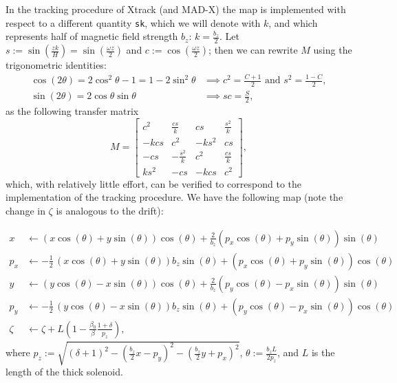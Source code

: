 In the tracking procedure of Xtrack (and MAD-X) the map is implemented with respect to a different quantity \verb|sk|, which we will denote with $k$, and which represents half of magnetic field strength $b_z$: $k = \frac{b_z}{2}$.
Let $s := \sin(\frac{z k}{H}) = \sin(\frac{\omega z}{2})$ and $c := \cos(\frac{\omega z}{2})$; then we can rewrite $M$ using the trigonometric identities:
\begin{align*}
  \cos(2 \theta) = 2 \cos^2\theta - 1 = 1 - 2 \sin^2\theta &\implies c^2 = \frac{C + 1}{2} \text{ and } s^2 = \frac{1 - C}{2}, \\
  \sin(2 \theta) = 2 \cos\theta \sin\theta &\implies sc = \frac{S}{2},
\end{align*}
as the following transfer matrix
\[
  M = \begin{bmatrix}
    c^2 & \frac{cs}{k} & cs & \frac{s^2}{k} \\
    -kcs & c^2 & -ks^2 & cs \\
    -cs & -\frac{s^2}{k} & c^2 & \frac{cs}{k} \\
    ks^2 & -cs & -kcs & c^2
  \end{bmatrix},
\]
which, with relatively little effort, can be verified to correspond to the implementation of the tracking procedure.
We have the following map (note the change in $\zeta$ is analogous to the drift):

\begin{align*}
  x &\leftarrow {\left(x \cos\left(\theta\right) + y \sin\left(\theta\right)\right)} \cos\left(\theta\right) + \frac{2}{b_{z}} {\left(p_{x} \cos\left(\theta\right) + p_{y} \sin\left(\theta\right)\right)} \sin\left(\theta\right) \\
  p_x &\leftarrow -\frac{1}{2} \, {\left(x \cos\left(\theta\right) + y \sin\left(\theta\right)\right)} b_{z} \sin\left(\theta\right) + {\left(p_{x} \cos\left(\theta\right) + p_{y} \sin\left(\theta\right)\right)} \cos\left(\theta\right) \\
  y &\leftarrow {\left(y \cos\left(\theta\right) - x \sin\left(\theta\right)\right)} \cos\left(\theta\right) + \frac{2}{b_{z}} {\left(p_{y} \cos\left(\theta\right) - p_{x} \sin\left(\theta\right)\right)} \sin\left(\theta\right) \\
  p_y &\leftarrow -\frac{1}{2} \, {\left(y \cos\left(\theta\right) - x \sin\left(\theta\right)\right)} b_{z} \sin\left(\theta\right) + {\left(p_{y} \cos\left(\theta\right) - p_{x} \sin\left(\theta\right)\right)} \cos\left(\theta\right) \\
  \zeta &\leftarrow \zeta + L \left(1 - \frac{\beta_0}{\beta} \frac{1 + \delta}{p_z}\right),
\end{align*}
where $p_z :=  \sqrt{{\left(\delta + 1\right)}^2 - {\left(\frac{b_z}{2} x - p_{y}\right)}^{2} - {\left(\frac{b_{z}}{2} y + p_{x}\right)}^{2}}$, $\theta := \frac{b_{z} L}{2 p_z} $, and $L$ is the length of the thick solenoid.

